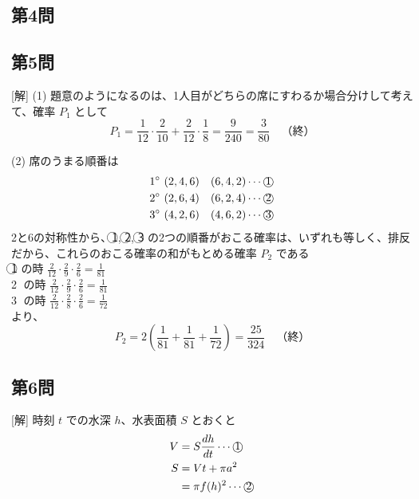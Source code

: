 \documentclass[../main.tex]{subfiles}
\begin{document}
\subsection*{第4問}

\subsection*{第5問}
[解] (1) 題意のようになるのは、1人目がどちらの席にすわるか場合分けして考えて、確率 $P_1$ として
\[
  P_1 = \frac{1}{12} \cdot \frac{2}{10} + \frac{2}{12} \cdot \frac{1}{8} = \frac{9}{240} = \frac{3}{80} \quad \text{（終）}
\]

(2) 席のうまる順番は
\begin{align*}
  & 1^\circ \ (2, 4, 6) \quad (6, 4, 2) \cdots \text{\textcircled{1}} \\
  & 2^\circ \ (2, 6, 4) \quad (6, 2, 4) \cdots \text{\textcircled{2}} \\
  & 3^\circ \ (4, 2, 6) \quad (4, 6, 2) \cdots \text{\textcircled{3}}
\end{align*}
2と6の対称性から、\textcircled{1}, \textcircled{2}, \textcircled{3} の2つの順番がおこる確率は、いずれも等しく、排反だから、これらのおこる確率の和がもとめる確率 $P_2$ である\\
\textcircled{1} の時 $\frac{2}{12} \cdot \frac{2}{9} \cdot \frac{2}{6} = \frac{1}{81}$ \\
\textcircled{2} の時 $\frac{2}{12} \cdot \frac{2}{9} \cdot \frac{2}{6} = \frac{1}{81}$ \\
\textcircled{3} の時 $\frac{2}{12} \cdot \frac{2}{8} \cdot \frac{2}{6} = \frac{1}{72}$ \\
より、
\[
  P_2 = 2 \left( \frac{1}{81} + \frac{1}{81} + \frac{1}{72} \right) = \frac{25}{324} \quad \text{（終）}
\]

\subsection*{第6問}
[解] 時刻 $t$ での水深 $h$、水表面積 $S$ とおくと
\begin{align*}
  V &= S \frac{dh}{dt} \cdots \text{\textcircled{1}} \\
  S &= V t + \pi a^2 \\
  &= \pi f(h)^2 \cdots \text{\textcircled{2}}
\end{align*}
\end{document}
